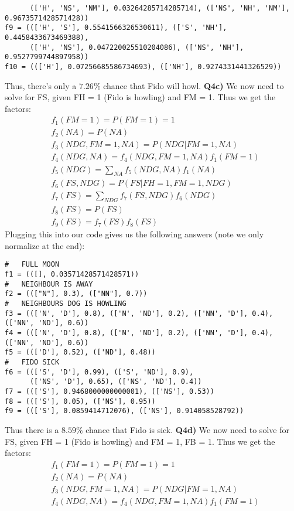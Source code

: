 \documentclass{article}
\begin{document}
\begin{titlepage}
\begin{lstlisting}
      (['H', 'NS', 'NM'], 0.03264285714285714), (['NS', 'NH', 'NM'], 0.9673571428571428))
f9 = ((['H', 'S'], 0.5541566326530611), (['S', 'NH'], 0.4458433673469388),
      (['H', 'NS'], 0.047220025510204086), (['NS', 'NH'], 0.9527799744897958))
f10 = ((['H'], 0.07256685586734693), (['NH'], 0.9274331441326529))
\end{lstlisting}
Thus, there's only a $7.26\%$ chance that Fido will howl.
\newpage
\textbf{Q4c)} We now need to solve for FS, given FH = 1 (Fido is howling) and FM = 1. Thus we get the factors:
\begin{align*}
& f_1(FM = 1) = P(FM = 1) = 1 \\ 
& f_2(NA) = P(NA) \\
& f_3(NDG, FM = 1, NA) = P(NDG | FM = 1, NA) \\
& f_4(NDG, NA) = f_4(NDG, FM = 1, NA)f_1(FM = 1)  \\
& f_5(NDG) = \sum_{NA} f_5(NDG, NA)f_1(NA) \\
& f_6(FS, NDG) = P(FS | FH = 1, FM = 1, NDG) \\
& f_7(FS) = \sum_{NDG} f_7(FS, NDG)f_6(NDG)  \\
& f_8(FS) = P(FS) \\
& f_9(FS) = f_7(FS)f_8(FS)
\end{align*}
Plugging this into our code gives us the following answers (note we only normalize at the end):
\begin{lstlisting}
#   FULL MOON
f1 = (([], 0.03571428571428571))
#   NEIGHBOUR IS AWAY
f2 = ((["N"], 0.3), (["NN"], 0.7))
#   NEIGHBOURS DOG IS HOWLING
f3 = ((['N', 'D'], 0.8), (['N', 'ND'], 0.2), (['NN', 'D'], 0.4), (['NN', 'ND'], 0.6))
f4 = ((['N', 'D'], 0.8), (['N', 'ND'], 0.2), (['NN', 'D'], 0.4), (['NN', 'ND'], 0.6))
f5 = ((['D'], 0.52), (['ND'], 0.48))
#   FIDO SICK
f6 = ((['S', 'D'], 0.99), (['S', 'ND'], 0.9), 
	  (['NS', 'D'], 0.65), (['NS', 'ND'], 0.4))
f7 = ((['S'], 0.9468000000000001), (['NS'], 0.53))
f8 = ((['S'], 0.05), (['NS'], 0.95))
f9 = ((['S'], 0.0859414712076), (['NS'], 0.914058528792))
\end{lstlisting}
Thus there is a $8.59\%$ chance that Fido is sick.
\newpage
\textbf{Q4d)} We now need to solve for FS, given FH = 1 (Fido is howling) and FM = 1, FB = 1. Thus we get the factors:
\begin{align*}
& f_1(FM = 1) = P(FM = 1) = 1 \\ 
& f_2(NA) = P(NA) \\
& f_3(NDG, FM = 1, NA) = P(NDG | FM = 1, NA) \\
& f_4(NDG, NA) = f_4(NDG, FM = 1, NA)f_1(FM = 1)  \\

\end{align*}
\end{titlepage}
\end{document}
